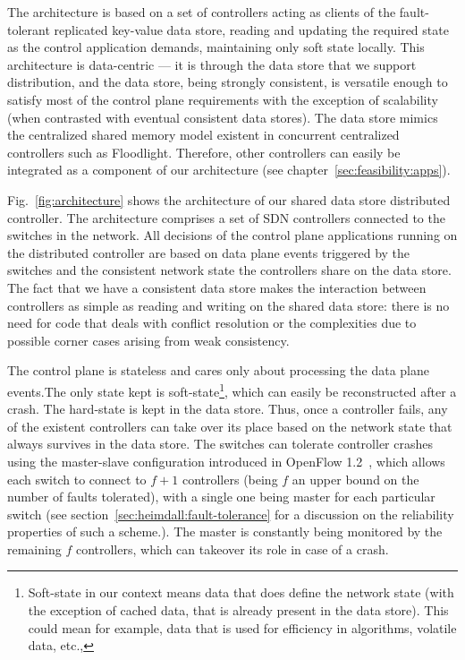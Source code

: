 The architecture is based on a set of controllers acting as clients of the fault-tolerant replicated key-value data store, reading and updating the required state as the control application demands, maintaining only soft state locally. 
This architecture is data-centric --- it is through the data store that we support distribution, and the data store, being strongly consistent,  is versatile enough to satisfy most of the control plane requirements with the exception of scalability (when contrasted with eventual consistent data stores). 
The data store mimics the centralized shared memory model existent in concurrent centralized controllers such as Floodlight. 
Therefore, other controllers can easily be integrated as a component of our architecture  (see chapter~\ref{sec:feasibility:apps}). 

Fig.~\ref{fig:architecture} shows the architecture of our shared data store distributed controller.
The architecture comprises a set of SDN controllers connected to the switches in the network.
All decisions of the control plane applications running on the distributed controller are based on data plane events triggered by the switches and the consistent network state the controllers share on the data store.
The fact that we have a consistent data store makes the interaction between controllers as simple as reading and writing on the shared data store: there is no need for code that deals with conflict resolution or the complexities due to possible corner cases arising from weak consistency.



The control plane is stateless and cares only about processing the data plane events.The only state kept is soft-state\footnote{Soft-state in our context means data that does define the network state (with the exception of cached data, that is already present in the data store). This could mean for example, data that is used for efficiency in algorithms, volatile data, etc.,}, which can easily be reconstructed after a crash. The hard-state is kept in the data store. 
Thus, once a controller fails, any of the existent controllers can take over its place based on the network state that always survives in the data store. 
The switches can tolerate controller crashes using the master-slave configuration introduced in OpenFlow 1.2~\cite{ONF2011}, which allows each switch to connect  to  $f+1$ controllers (being $f$ an upper bound on the number of faults tolerated), with a single one being master for each particular switch (see section~\ref{sec:heimdall:fault-tolerance} for a discussion on the reliability properties of such a scheme.). 
The master is constantly being monitored by the remaining $f$ controllers, which can takeover its role in case of a crash.

